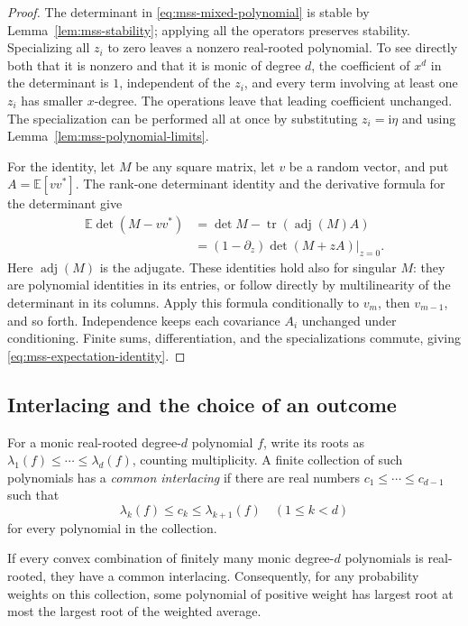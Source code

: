 \begin{proof}
The determinant in \eqref{eq:mss-mixed-polynomial} is stable by
Lemma~\ref{lem:mss-stability}; applying all the operators preserves
stability.  Specializing all $z_i$ to zero leaves a nonzero real-rooted
polynomial.  To see directly both that it is nonzero and that it is
monic of degree $d$, the coefficient of $x^d$ in the determinant is
$1$, independent of the $z_i$, and every term involving at least one
$z_i$ has smaller $x$-degree.  The operations leave that leading
coefficient unchanged.  The specialization can be performed all at
once by substituting $z_i=\mathrm i\eta$ and using
Lemma~\ref{lem:mss-polynomial-limits}.

For the identity, let $M$ be any square matrix, let $v$ be a random
vector, and put $A=\mathbb E[vv^*]$.  The rank-one determinant identity
and the derivative formula for the determinant give
\begin{align*}
 \mathbb E\det(M-vv^*)
 &=\det M-\operatorname{tr}(\operatorname{adj}(M)A)\\
 &=\left.(1-\partial_z)\det(M+zA)\right|_{z=0}.
\end{align*}
Here $\operatorname{adj}(M)$ is the adjugate.  These identities hold
also for singular $M$: they are polynomial identities in its entries,
or follow directly by multilinearity of the determinant in its
columns.  Apply this formula conditionally to $v_m$, then $v_{m-1}$,
and so forth.  Independence keeps each covariance $A_i$ unchanged
under conditioning.  Finite sums, differentiation, and the
specializations commute, giving
\eqref{eq:mss-expectation-identity}.
\end{proof}

\subsection{Interlacing and the choice of an outcome}

For a monic real-rooted degree-$d$ polynomial $f$, write its roots as
$\lambda_1(f)\leq\cdots\leq\lambda_d(f)$, counting multiplicity.
A finite collection of such polynomials has a \emph{common
interlacing} if there are real numbers
$c_1\leq\cdots\leq c_{d-1}$ such that
\[
 \lambda_k(f)\leq c_k\leq\lambda_{k+1}(f)
 \quad(1\leq k<d)
\]
for every polynomial in the collection.

\begin{lemma}
\label{lem:mss-common-interlacing}
If every convex combination of finitely many monic degree-$d$
polynomials is real-rooted, they have a common interlacing.
Consequently, for any probability weights on this collection, some
polynomial of positive weight has largest root at most the largest
root of the weighted average.
\end{lemma}

